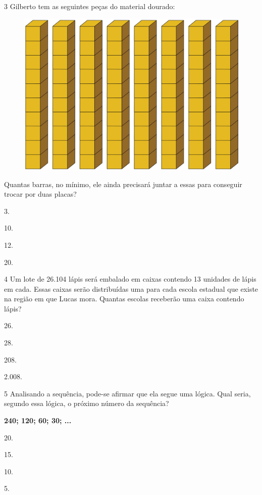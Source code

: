 \num{3} Gilberto tem as seguintes peças do material dourado:

\begin{figure}[htpb!]
\centering
\includegraphics[width=.5\textwidth]{./media/image103.png}
\end{figure}

Quantas barras, no mínimo, ele ainda precisará juntar a essas para conseguir trocar por duas placas?

\begin{escolha}
\item
  3.
\item
  10.
\item
  12.
\item
  20.
\end{escolha}

\num{4} Um lote de 26.104 lápis será embalado em caixas contendo 13 unidades de
lápis em cada. Essas caixas serão distribuídas uma para cada escola
estadual que existe na região em que Lucas mora. Quantas escolas
receberão uma caixa contendo lápis?

\begin{escolha}
\item
  26.
\item
  28.
\item
  208.
\item
  2.008.
\end{escolha}

\num{5} Analisando a sequência, pode-se afirmar que ela segue uma lógica. Qual seria, segundo essa lógica, o próximo número da sequência?

\begin{myquote}
\centering
\textbf{240; 120; 60; 30; ...}
\end{myquote}

\begin{multicols}{2}
\begin{escolha}
\item
  20.
\item
  15.
\item
  10.
\item
  5.
\end{escolha}
\end{multicols}


